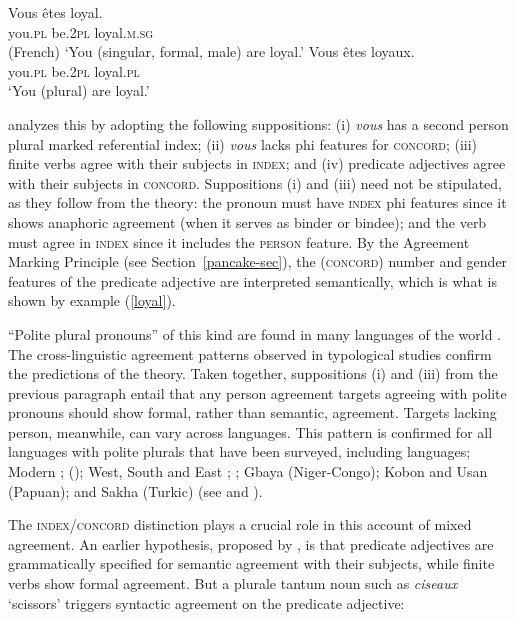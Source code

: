 \documentclass[output=paper
 	        ,biblatex
                ,babelshorthands
                ,newtxmath
                ,draftmode
                ,colorlinks, citecolor=brown
]{langscibook}
\begin{document}
\begin{exe} 
\ex\label{loyal}
\begin{xlist}
\ex
\gll   Vous		\^{e}tes		loyal. \\
		you.\textsc{pl}		be.\textsc{2pl}	loyal.\textsc{m.sg} \\\hfill(French)
\glt		`You (singular, formal, male) are loyal.’ 
\ex 
\gll	Vous		\^{e}tes		loyaux. \\
		you.\textsc{pl}		be.\textsc{2pl}	loyal.\textsc{pl} \\
\glt		`You (plural) are loyal.’  
\end{xlist}
\end{exe}

\noindent
\citet{Wechsler:2011} analyzes this by adopting the following suppositions: (i) \textit{vous} has a  second person plural marked referential index; (ii) \textit{vous} lacks phi features for \textsc{concord}; (iii) finite verbs agree with their subjects in \textsc{index}; and (iv) predicate adjectives agree with their subjects in \textsc{concord}.  Suppositions (i) and (iii) need not be stipulated, as they follow from the theory:  the pronoun must have \textsc{index} phi features since it shows anaphoric agreement (when it serves as binder or bindee); and the verb must agree in \textsc{index} since it includes the \textsc{person} feature.  By the Agreement Marking Principle (see Section~\ref{pancake-sec}), the (\textsc{concord}) number and gender features of the predicate adjective are interpreted semantically, which is what is shown by example (\ref{loyal}). 

``Polite plural pronouns'' of this kind are found in many languages of the world \citep{Head:1978}.   The cross-linguistic agreement patterns observed in typological studies \citep{Comrie:1975,Wechsler:2011} confirm the predictions of the theory.  Taken together, suppositions (i) and (iii) from the previous paragraph entail that any person agreement targets agreeing with polite pronouns should show formal, rather than semantic, agreement.  Targets lacking person, meanwhile, can vary across languages.  This pattern is confirmed for all languages with polite plurals that have been surveyed, including  languages; Modern ;  (); West, South and East ; ; Gbaya (Niger-Congo);  Kobon and Usan (Papuan); and Sakha (Turkic) (see \citealt{Comrie:1975} and \citealt{Wechsler:2011}).   
 
The \textsc{index/concord} distinction plays a crucial role in this account of mixed agreement.  An earlier hypothesis, proposed by \citet[230]{Kathol99b}, is that  predicate adjectives are grammatically specified for semantic  agreement with their subjects, while finite verbs show formal agreement.  But a plurale tantum noun such as \textit{ciseaux} `scissors’ triggers syntactic agreement on the predicate adjective:
	
\end{document}
